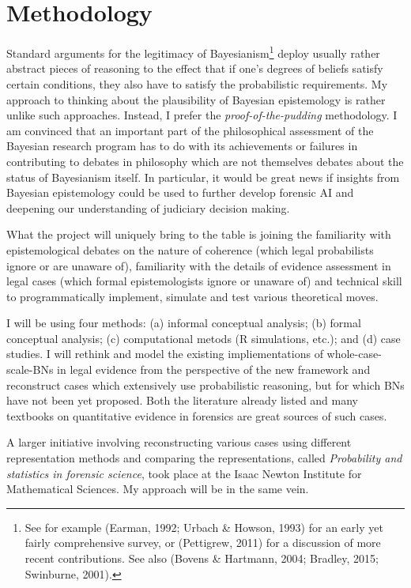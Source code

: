 \documentclass[11pt,dvipsnames,enabledeprecatedfontcommands]{scrartcl}
\begin{document}
\section{Methodology}\label{methodology}

Standard arguments for the legitimacy of Bayesianism\footnote{See for
  example (Earman, 1992; Urbach \& Howson, 1993) for an early yet fairly
  comprehensive survey, or (Pettigrew, 2011) for a discussion of more
  recent contributions. See also (Bovens \& Hartmann, 2004; Bradley,
  2015; Swinburne, 2001).} deploy usually rather abstract pieces of
reasoning to the effect that if one's degrees of beliefs satisfy certain
conditions, they also have to satisfy the probabilistic requirements. My
approach to thinking about the plausibility of Bayesian epistemology is
rather unlike such approaches. Instead, I prefer the
\emph{proof-of-the-pudding} methodology. I am convinced that an
important part of the philosophical assessment of the Bayesian research
program has to do with its achievements or failures in contributing to
debates in philosophy which are not themselves debates about the status
of Bayesianism itself. In particular, it would be great news if insights
from Bayesian epistemology could be used to further develop forensic AI
and deepening our understanding of judiciary decision making.

What the project will uniquely bring to the table is joining the
familiarity with epistemological debates on the nature of coherence
(which legal probabilists ignore or are unaware of), familiarity with
the details of evidence assessment in legal cases (which formal
epistemologists ignore or unaware of) and technical skill to
programmatically implement, simulate and test various theoretical moves.

I will be using four methods: (a) informal conceptual analysis; (b)
formal conceptual analysis; (c) computational metods (R simulations,
etc.); and (d) case studies. I will rethink and model the existing
impliementations of whole-case-scale-BNs in legal evidence from the
perspective of the new framework and reconstruct cases which extensively
use probabilistic reasoning, but for which BNs have not been yet
proposed. Both the literature already listed and many textbooks on
quantitative evidence in forensics are great sources of such cases.

A larger initiative involving reconstructing various cases using
different representation methods and comparing the representations,
called \emph{Probability and statistics in forensic science}, took place
at the Isaac Newton Institute for Mathematical Sciences. My approach
will be in the same vein.
\end{document}
